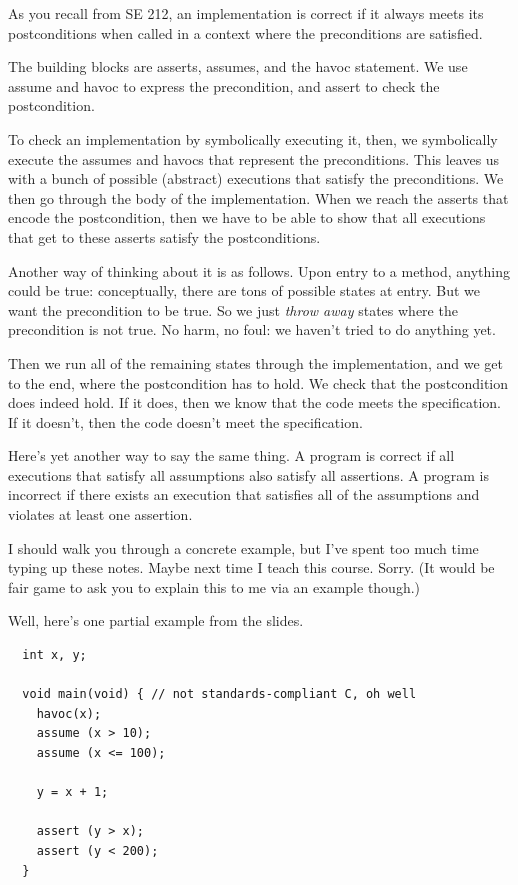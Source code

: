 \documentclass[11pt]{article}
\begin{document}
As you recall from SE 212, an implementation is correct if it always meets
its postconditions when called in a context where the preconditions are
satisfied.

The building blocks are asserts, assumes, and the havoc statement.
We use assume and havoc to express the precondition, and assert to
check the postcondition.

To check an implementation by symbolically executing it, then, we
symbolically execute the assumes and havocs that represent the
preconditions. This leaves us with a bunch of possible (abstract)
executions that satisfy the preconditions. We then go through the body
of the implementation. When we reach the asserts that encode the
postcondition, then we have to be able to show that all executions that get to
these asserts satisfy the postconditions.

Another way of thinking about it is as follows. Upon entry to a
method, anything could be true: conceptually, there are tons of
possible states at entry. But we want the precondition to be true.
So we just \emph{throw away} states where the precondition is not true.
No harm, no foul: we haven't tried to do anything yet.

Then we run all of the remaining states through the implementation,
and we get to the end, where the postcondition has to hold. We check
that the postcondition does indeed hold. If it does, then we know that
the code meets the specification. If it doesn't, then the code doesn't
meet the specification.

Here's yet another way to say the same thing. A program is correct if all
executions that satisfy all assumptions also satisfy all assertions. A
program is incorrect if there exists an execution that satisfies all
of the assumptions and violates at least one assertion.

I should walk you through a concrete example, but I've spent too much time
typing up these notes. Maybe next time I teach this course. Sorry. (It
would be fair game to ask you to explain this to me via an example
though.)

Well, here's one partial example from the slides.

\begin{lstlisting}
  int x, y;
  
  void main(void) { // not standards-compliant C, oh well
    havoc(x);
    assume (x > 10);
    assume (x <= 100);

    y = x + 1;

    assert (y > x);
    assert (y < 200);
  }
\end{lstlisting}
\end{document}
